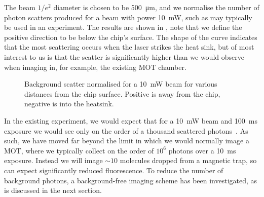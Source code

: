 The beam $1/e^2$ diameter is chosen to be \SI{500}{\micro\meter}, and we
normalise the number of photon scatters produced for a beam with power
\SI{10}{\milli\watt}, such as may typically be used in an experiment. The
results are shown in , note that we define the
positive direction to be below the chip's surface. The shape of the curve
indicates that the most scattering occurs when the laser strikes the heat sink,
but of most interest to us is that the scatter is significantly higher than we
would observe when imaging in, for example, the existing MOT chamber.


\begin{figure}
  \centering
  \caption{Background scatter normalised for a \SI{10}{\milli\watt} beam for
  various distances from the chip surface. Positive is away from the chip,
negative is into the heatsink.}
  \label{exper:fig:scatter}
\end{figure}

In the existing experiment, we would expect that for a \SI{10}{\milli\watt}
beam and \SI{100}{\milli\second} exposure we would see only on the order of a
thousand scattered photons~\cite{Williams2018}. As such, we have moved far
beyond the limit in which we would normally image a MOT, where we typically
collect on the order of $10^6$ photons over a \SI{10}{\milli\second} exposure.
Instead we will image $\sim10$ molecules dropped from a magnetic trap, so can
expect significantly reduced fluorescence.  To reduce the number of background
photons, a background-free imaging scheme has been investigated, as is
discussed in the next section.


